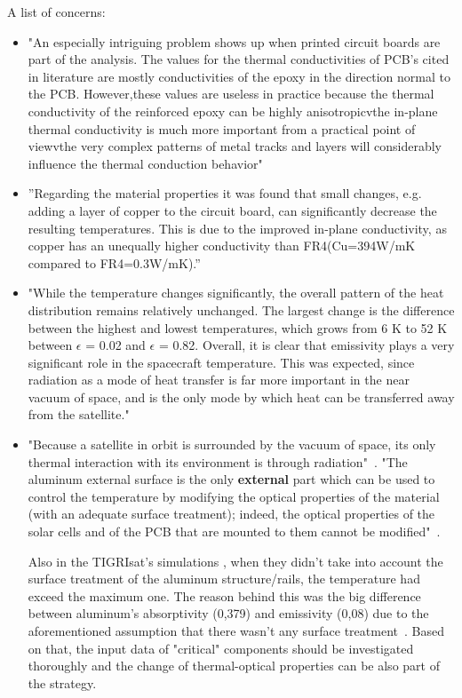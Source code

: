 \documentclass[final]{cubedoc}
\begin{document}
A list of concerns:

\begin{itemize}
    \item "An especially intriguing problem shows up when printed circuit boards are part of the analysis. The values for the thermal conductivities of PCB’s cited in literature are mostly conductivities of the epoxy in the direction normal to the PCB. However,these values are useless in practice because the thermal conductivity of the reinforced epoxy can be highly anisotropicvthe in-plane thermal conductivity is much more important from a practical point of viewvthe very complex patterns of metal tracks and layers will considerably influence the thermal conduction behavior"~\cite{lasance2002}
    \item ”Regarding the material properties it was found that small changes, e.g.  adding a layer of copper to the circuit board, can significantly decrease the resulting temperatures.  This is due to the improved in-plane conductivity, as copper has an unequally higher conductivity than FR4(Cu=394W/mK compared to FR4=0.3W/mK).” 
    \item "While the temperature changes significantly, the overall pattern of the heat distribution remains relatively unchanged. The largest change is the difference between the highest and lowest temperatures, which grows from 6 K to 52 K between $\epsilon$ = 0.02 and $\epsilon$ = 0.82. Overall, it is clear that emissivity plays a very significant role in the spacecraft temperature. This was expected, since radiation as a mode of heat transfer is far more important in the near vacuum of space, and is the only mode by which heat can be transferred away from the satellite."~\cite{peake2014cubesat}
    \item "Because a satellite in orbit is surrounded by the vacuum of space, its only
thermal interaction with its environment is through radiation"~\cite{vanoutryve2008}.
"The aluminum external surface is the only \textbf{external} part which can be used to control the temperature by modifying the optical properties of the material (with an adequate surface treatment); indeed, the optical properties of the solar cells and of the PCB that are mounted to them cannot be modified"~\cite{paris2015}.

Also in the TIGRIsat's simulations , when they didn't take into account the surface treatment of the aluminum structure/rails, the temperature had exceed the maximum one. The reason behind this was the big difference between aluminum's absorptivity (0,379) and emissivity (0,08) due to the aforementioned assumption that there wasn't any surface treatment~\cite{paris2015}. Based on that, the input data of "critical" components should be investigated thoroughly and the change of thermal-optical properties can be also part of the strategy.
\end{itemize}
\end{document}
